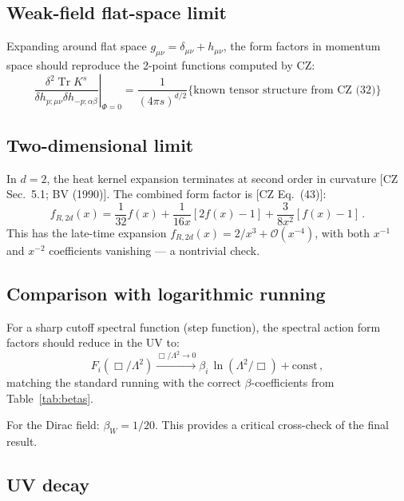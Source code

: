 \documentclass[12pt,a4paper]{article}
\theoremstyle{definition}
\theoremstyle{remark}
\newcommand{\Tr}{\operatorname{Tr}}
\newcommand{\fromlit}[1]{\textcolor{blue!70!black}{\textsf{[#1]}}}
\begin{document}
\subsection{Weak-field flat-space limit}

Expanding around flat space $g_{\mu\nu} = \delta_{\mu\nu} + h_{\mu\nu}$,
the form factors in momentum space should reproduce the 2-point
functions computed by CZ:
\begin{equation}
  \left.\frac{\delta^2\Tr K^s}{\delta h_{p;\mu\nu}\delta h_{-p;\alpha\beta}}
  \right|_{\Phi=0}
  = \frac{1}{(4\pi s)^{d/2}}\bigl\{
  \text{known tensor structure from CZ~(32)}
  \bigr\}
  \label{eq:flat-check}
\end{equation}


\subsection{Two-dimensional limit}

In $d=2$, the heat kernel expansion terminates at second order in
curvature \fromlit{CZ Sec.~5.1; BV (1990)}.
The combined form factor is \fromlit{CZ Eq.~(43)}:
\begin{equation}
  f_{R,2d}(x) = \frac{1}{32}f(x)
  + \frac{1}{16x}[2f(x)-1]
  + \frac{3}{8x^2}[f(x)-1]\,.
  \label{eq:2d-ff}
\end{equation}
This has the late-time expansion $f_{R,2d}(x) = 2/x^3 + \mathcal{O}(x^{-4})$,
with both $x^{-1}$ and $x^{-2}$ coefficients vanishing --- a nontrivial
check.


\subsection{Comparison with logarithmic running}

For a sharp cutoff spectral function (step function), the spectral
action form factors should reduce in the UV to:
\begin{equation}
  F_i(\Box/\Lambda^2)
  \xrightarrow{\Box/\Lambda^2 \to 0}
  \beta_i\,\ln(\Lambda^2/\Box) + \text{const}\,,
  \label{eq:log-check}
\end{equation}
matching the standard running with the correct $\beta$-coefficients
from Table~\ref{tab:betas}.

For the Dirac field: $\beta_W = 1/20$.  This provides a critical
cross-check of the final result.


\subsection{UV decay}
\end{document}
